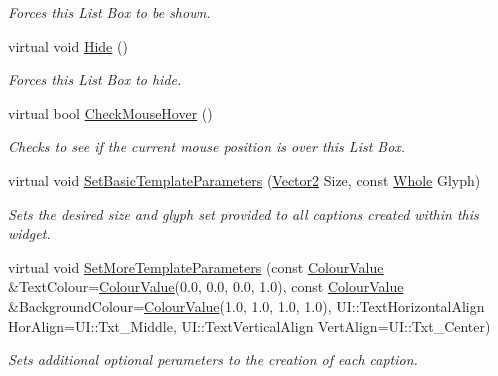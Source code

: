 \begin{DoxyCompactItemize}
\begin{DoxyCompactList}\small\item\em Forces this List Box to be shown. \item\end{DoxyCompactList}\item 
\hypertarget{classphys_1_1UI_1_1ListBox_a896220f2423ce6295ea3c8dc3a10d4b8}{
virtual void \hyperlink{classphys_1_1UI_1_1ListBox_a896220f2423ce6295ea3c8dc3a10d4b8}{Hide} ()}
\label{d0/d28/classphys_1_1UI_1_1ListBox_a896220f2423ce6295ea3c8dc3a10d4b8}

\begin{DoxyCompactList}\small\item\em Forces this List Box to hide. \item\end{DoxyCompactList}\item 
virtual bool \hyperlink{classphys_1_1UI_1_1ListBox_a789faeb98d98bb4d4d89cae8c53d4bc0}{CheckMouseHover} ()
\begin{DoxyCompactList}\small\item\em Checks to see if the current mouse position is over this List Box. \item\end{DoxyCompactList}\item 
virtual void \hyperlink{classphys_1_1UI_1_1ListBox_a093415bd4d69dfdb0b1ffa3f868fe4f5}{SetBasicTemplateParameters} (\hyperlink{classphys_1_1Vector2}{Vector2} Size, const \hyperlink{namespacephys_a460f6bc24c8dd347b05e0366ae34f34a}{Whole} Glyph)
\begin{DoxyCompactList}\small\item\em Sets the desired size and glyph set provided to all captions created within this widget. \item\end{DoxyCompactList}\item 
virtual void \hyperlink{classphys_1_1UI_1_1ListBox_a8396c55be0de8fd33d8ce35b83781540}{SetMoreTemplateParameters} (const \hyperlink{classphys_1_1ColourValue}{ColourValue} \&TextColour=\hyperlink{classphys_1_1ColourValue}{ColourValue}(0.0, 0.0, 0.0, 1.0), const \hyperlink{classphys_1_1ColourValue}{ColourValue} \&BackgroundColour=\hyperlink{classphys_1_1ColourValue}{ColourValue}(1.0, 1.0, 1.0, 1.0), UI::TextHorizontalAlign HorAlign=UI::Txt\_\-Middle, UI::TextVerticalAlign VertAlign=UI::Txt\_\-Center)
\begin{DoxyCompactList}\small\item\em Sets additional optional perameters to the creation of each caption. \item\end{DoxyCompactList}\item 

\end{DoxyCompactItemize}
